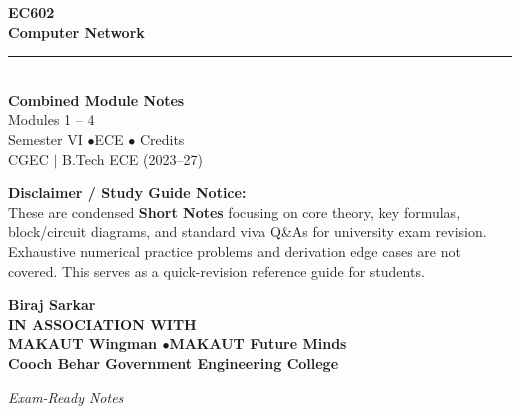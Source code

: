 \documentclass[12pt,a4paper]{article}
\begin{document}
\thispagestyle{empty}


\vspace*{1.0cm}
\begin{center}
  {\Huge\bfseries\color{myred} EC602}\\[10pt]
  {\LARGE\bfseries\color{mydark} Computer Network}\\[20pt]
  {\color{myred}\rule{0.7\linewidth}{1.5pt}}\\[18pt]
  {\Large\color{myteal}\textbf{Combined Module Notes}}\\[8pt]
  {\large\color{mydark} Modules 1 -- 4}\\[40pt]
  {\normalsize\color{mydark} Semester VI \quad$\bullet$\quad ECE \quad$\bullet$ Credits}\\[12pt]
  {\normalsize\color{mydark} CGEC \;$|$\; B.Tech ECE (2023--27)}
\end{center}
\vspace{1.0cm}
\begin{center}
  \begin{tcolorbox}[colback=mygray, colframe=mgframe, boxrule=0.5pt, arc=3pt, width=0.85\linewidth]
    \centering\small\color{mydark}
    \textbf{Disclaimer / Study Guide Notice:}\\
    These are condensed \textbf{Short Notes} focusing on core theory, key formulas, block/circuit diagrams, and standard viva Q\&As for university exam revision. Exhaustive numerical practice problems and derivation edge cases are not covered. This serves as a quick-revision reference guide for students.
  \end{tcolorbox}
\end{center}
\vfill
\vspace{0.6cm}
\begin{center}
  {\large\bfseries\color{mypurple} Biraj Sarkar}\\[16pt]
  {\footnotesize\color{watermark}\textbf{IN ASSOCIATION WITH}}\\[8pt]
  {\small\bfseries\color{mydark} MAKAUT Wingman \quad$\bullet$\quad MAKAUT Future Minds}\\[12pt]
  {\large\bfseries\color{myteal} Cooch Behar Government Engineering College}
\end{center}
\vfill
\begin{center}{\small\color{watermark}\textit{Exam-Ready Notes}}\end{center}
\clearpage
\end{document}
